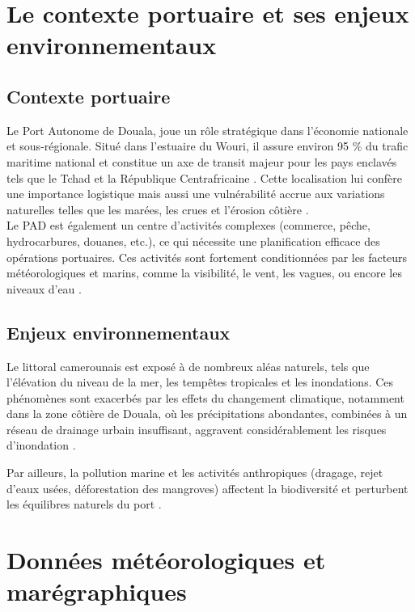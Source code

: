 \documentclass[a4paper,12pt,openany]{report}
\begin{document}
	\section{Le contexte portuaire et ses enjeux environnementaux}
	
	\subsection{ Contexte portuaire }
	
	\quad Le Port Autonome de Douala, joue un rôle stratégique dans l'économie nationale et sous-régionale. Situé dans l'estuaire du Wouri, il assure environ 95 \% du trafic maritime national et constitue un axe de transit majeur pour les pays enclavés tels que le Tchad et la République Centrafricaine \cite{PAD2023}. Cette localisation lui confère une importance logistique mais aussi une vulnérabilité accrue aux variations naturelles telles que les marées, les crues et l'érosion côtière  \cite{Bruckmann2019} .  \\

	\quad  
	Le PAD est également un centre d'activités complexes (commerce, pêche, hydrocarbures, douanes, etc.), ce qui nécessite une planification efficace des opérations portuaires. Ces activités sont fortement conditionnées par les facteurs météorologiques et marins, comme la visibilité, le vent, les vagues, ou encore les niveaux d'eau \cite{OMM2023} .\\
	

	
	\subsection{Enjeux environnementaux }
	
	
	\quad Le littoral camerounais est exposé à de nombreux aléas naturels, tels que l’élévation du niveau de la mer, les tempêtes tropicales et les inondations. Ces phénomènes sont exacerbés par les effets du changement climatique, notamment dans la zone côtière de Douala, où les précipitations abondantes, combinées à un réseau de drainage urbain insuffisant, aggravent considérablement les risques d’inondation \cite{Bruckmann2019}.
	
	\quad Par ailleurs, la pollution marine et les activités anthropiques (dragage, rejet d’eaux usées, déforestation des mangroves) affectent la biodiversité et perturbent les équilibres naturels du port \cite{PNUE2021}.
	
	
	\section{Données météorologiques et marégraphiques }
\end{document}
